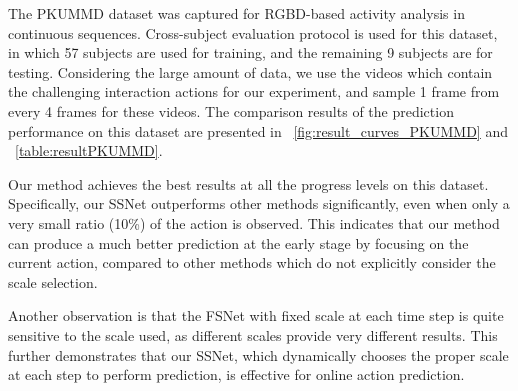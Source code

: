\documentclass[10pt,twocolumn,letterpaper]{article}
\begin{document}
The PKUMMD dataset \cite{liu2017pku} was captured for RGBD-based activity analysis in continuous sequences.
Cross-subject evaluation protocol is used for this dataset,
in which 57 subjects are used for training, and the remaining 9 subjects are for testing.
Considering the large amount of data, we use the videos which contain the challenging interaction actions for our experiment, and sample 1 frame from every 4 frames for these videos.
The comparison results of the prediction performance on this dataset are presented in \figurename{~\ref{fig:result_curves_PKUMMD}} and \tablename{~\ref{table:resultPKUMMD}}.

Our method achieves the best results at all the progress levels on this dataset.
Specifically, our SSNet outperforms other methods significantly, even when only a very small ratio (10\%) of the action is observed.
This indicates that our method can produce a much better prediction at the early stage by focusing on the current action, compared to other methods which do not explicitly consider the scale selection.

Another observation is that the FSNet with fixed scale at each time step is quite sensitive to the scale used,
as different scales provide very different results.
This further demonstrates that our SSNet, which dynamically chooses the proper scale at each step to perform prediction, is effective for online action prediction.
\end{document}
